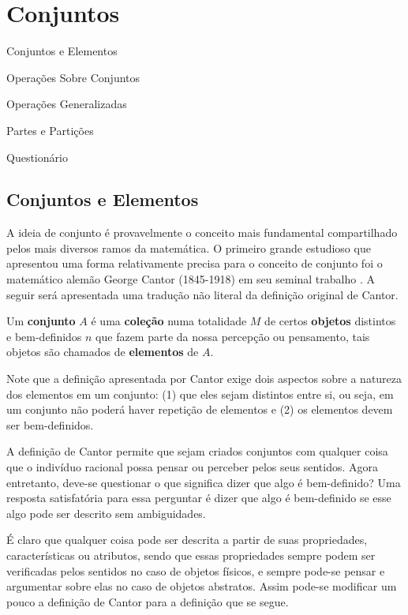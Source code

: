 \chapter{Conjuntos}\label{cap:Conjuntos}

\begin{introduction}[Conteúdos]
	\item Conjuntos e Elementos
	\item Operações Sobre Conjuntos
	\item Operações Generalizadas
	\item Partes e Partições
	\item Questionário
\end{introduction}

\section{Conjuntos e Elementos}\label{sec:ConjuntoElemento}

A ideia de conjunto é provavelmente o conceito mais fundamental compartilhado pelos mais diversos ramos da matemática. O primeiro grande estudioso que apresentou uma forma relativamente precisa para o conceito de conjunto foi o matemático alemão George Cantor (1845-1918) em seu seminal trabalho \cite{cantor1895}. A seguir será apresentada uma tradução não literal da definição original de Cantor.

\begin{definition}[Cantor]\label{def:ConjuntoCantor}
	Um \textbf{conjunto} $A$ é uma \textbf{coleção} numa totalidade $M$ de certos \textbf{objetos} distintos e bem-definidos $n$ que fazem parte da nossa percepção ou pensamento, tais objetos são chamados de \textbf{elementos} de $A$.
\end{definition}

Note que a definição apresentada por Cantor exige dois aspectos sobre a natureza dos elementos em um conjunto: (1) que eles sejam distintos entre si, ou seja, em um conjunto não poderá haver repetição de elementos e (2) os elementos devem ser bem-definidos. 

A definição de Cantor permite que sejam criados conjuntos com qualquer coisa que o indivíduo racional possa pensar ou perceber pelos seus sentidos. Agora entretanto, deve-se questionar o que significa dizer que algo é bem-definido? Uma resposta satisfatória para essa perguntar é dizer que algo é bem-definido se esse algo pode ser descrito sem ambiguidades. 

É claro que qualquer coisa pode ser descrita a partir de suas propriedades, características ou atributos, sendo que essas propriedades sempre podem ser verificadas pelos sentidos no caso de objetos físicos, e sempre pode-se pensar e argumentar sobre elas no caso de objetos abstratos. Assim pode-se modificar um pouco a definição de Cantor para a definição que se segue.


